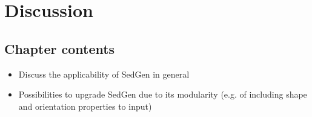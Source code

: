 \chapter{Discussion}\label{ch:discussion}

\section{Chapter contents}
\begin{itemize}
    \item Discuss the applicability of SedGen in general
    \item Possibilities to upgrade SedGen due to its modularity (e.g. of including shape and orientation properties to input)

\end{itemize}




\cleardoublepage


